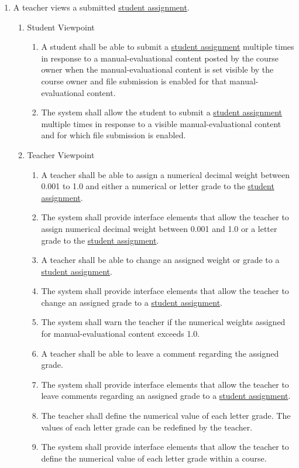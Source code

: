 \documentclass[]{article}
\begin{document}
\begin{enumerate}[{BE}1.]
	\item A teacher views a submitted \underline{student assignment}.
	\begin{enumerate}[{VP2}.1]
		\item Student Viewpoint
			\begin{enumerate}
				\item A student shall be able to submit a \underline{student assignment} multiple times in response to a manual-evaluational content posted by the course owner when the manual-evaluational content is set visible by the course owner and file submission is enabled for that manual-evaluational content.
        \item The system shall allow the student to submit a \underline{student assignment} multiple times in response to a visible manual-evaluational content and for which file submission is enabled.
			\end{enumerate}
		\item Teacher Viewpoint
			\begin{enumerate}
				\item A teacher shall be able to assign a numerical decimal weight between 0.001 to 1.0 and either a numerical or letter grade to the \underline{student assignment}.
        \item The system shall provide interface elements that allow the teacher to assign numerical decimal weight between 0.001 and 1.0 or a letter grade to the \underline{student assignment}.
				\item A teacher shall be able to change an assigned weight or grade to a \underline{student assignment}.
        \item The system shall provide interface elements that allow the teacher to change an assigned grade to a \underline{student assignment}.
				\item The system shall warn the teacher if the numerical weights assigned for manual-evaluational content exceeds 1.0.
				\item A teacher shall be able to leave a comment regarding the assigned grade.
        \item The system shall provide interface elements that allow the teacher to leave comments regarding an assigned grade to a \underline{student assignment}.
				\item The teacher shall define the numerical value of each letter grade. The values of each letter grade can be redefined by the teacher.
        \item The system shall provide interface elements that allow the teacher to define the numerical value of each letter grade within a course.

\end{enumerate}
\end{enumerate}
\end{enumerate}
\end{document}
